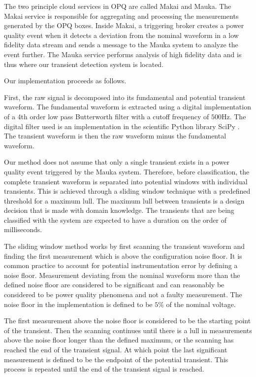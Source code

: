 \documentclass[10pt, conference, compsocconf]{IEEEtran}
\begin{document}
The two principle cloud services in OPQ are called Makai and Mauka.  The Makai service is responsible for aggregating and processing the measurements generated by the OPQ boxes. Inside Makai, a triggering broker creates a power quality event when it detects a deviation from the nominal waveform in a low fidelity data stream and sends a message to the Mauka system to analyze the event further. The Mauka service performs analysis of high fidelity data and is thus where our transient detection system is located.

Our implementation proceeds as follows.

First, the raw signal is decomposed into its fundamental and potential transient waveform. The fundamental waveform is extracted using a digital implementation of a 4th order low pass Butterworth filter with a cutoff frequency of $500$Hz. The digital filter used is an implementation in the scientific Python library SciPy \cite{scipy:2019}. The transient waveform is then the raw waveform minus the fundamental waveform.

Our method does not assume that only a single transient exists in a power quality event triggered by the Mauka system. Therefore, before classification, the complete transient waveform is separated into potential windows with individual transients. This is achieved through a sliding window technique with a predefined threshold for a maximum lull. The maximum lull between transients is a design decision that is made with domain knowledge. The transients that are being classified with the system are expected to have a duration on the order of milliseconds.

The sliding window method works by first scanning the transient waveform and finding the first measurement which is above the configuration noise floor. It is common practice to account for potential instrumentation error by defining a noise floor. Measurement deviating from the nominal waveform more than the defined noise floor are considered to be significant and can reasonably be considered to be power quality phenomena and not a faulty measurement. The noise floor in the implementation is defined to be $5\%$ of the nominal voltage.

The first measurement above the noise floor is considered to be the starting point of the transient. Then the scanning continues until there is a lull in measurements above the noise floor longer than the defined maximum, or the scanning has reached the end of the transient signal. At which point the last significant measurement is defined to be the endpoint of the potential transient. This process is repeated until the end of the transient signal is reached.
\end{document}
